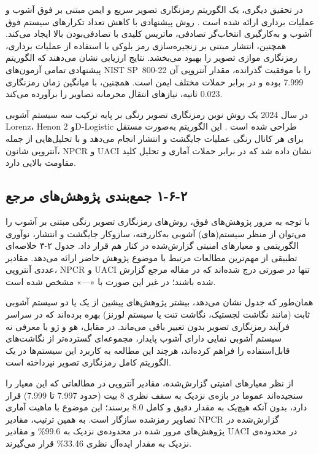 در تحقیق دیگری، یک الگوریتم رمزنگاری تصویر سریع و ایمن مبتنی بر فوق آشوب و عملیات برداری ارائه شده است \cite{ref12}. روش پیشنهادی با کاهش تعداد تکرارهای سیستم فوق آشوب و به‌کارگیری انتخاب‌گر تصادفی، ماتریس کلیدی با تصادفی‌بودن بالا ایجاد می‌کند. همچنین، انتشار مبتنی بر زنجیره‌سازی رمز بلوکی با استفاده از عملیات برداری، رمزنگاری موازی تصویر را بهبود می‌بخشد. نتایج ارزیابی نشان می‌دهند که الگوریتم پیشنهادی تمامی آزمون‌های NIST SP~800-22 را با موفقیت گذرانده، مقدار آنتروپی آن 7.999 بوده و در برابر حملات مختلف ایمن است. همچنین، با میانگین زمان رمزنگاری 0.023 ثانیه، نیازهای انتقال محرمانه تصاویر را برآورده می‌کند.

در سال 2024 یک روش نوین رمزنگاری تصویر رنگی بر پایه ترکیب سه سیستم آشوبی Lorenz، Henon و 2D-Logistic طراحی شده است \cite{ref13}. این الگوریتم به‌صورت مستقل برای هر کانال رنگی عملیات جایگشت و انتشار انجام می‌دهد و با تحلیل‌هایی از جمله آنتروپی شانون، NPCR و UACI نشان داده شد که در برابر حملات آماری و تحلیل کلید مقاومت بالایی دارد.

\subsection{‏۲‏-‏۶‏-‏۱‏ جمع‌بندی پژوهش‌های مرجع}

با توجه به مرور پژوهش‌های فوق، روش‌های رمزنگاری تصویر رنگی مبتنی بر آشوب را می‌توان از منظر سیستم(های) آشوبی به‌کاررفته، سازوکار جایگشت و انتشار، نوآوری الگوریتمی و معیارهای امنیتی گزارش‌شده در کنار هم قرار داد. جدول ۲-۳ خلاصه‌ای تطبیقی از مهم‌ترین مطالعات مرتبط با موضوع پژوهش حاضر ارائه می‌دهد. مقادیر عددی آنتروپی، NPCR و UACI تنها در صورتی درج شده‌اند که در مقاله مرجع گزارش شده باشند؛ در غیر این صورت با «---» مشخص شده است.

همان‌طور که جدول نشان می‌دهد، بیشتر پژوهش‌های پیشین از یک یا دو سیستم آشوبی ثابت (مانند نگاشت لجستیک، نگاشت تنت یا سیستم لورنز) بهره برده‌اند که در سراسر فرآیند رمزنگاری تصویر بدون تغییر باقی می‌ماند. در مقابل، هو و ژو \cite{ref4} با معرفی نه سیستم آشوبی نمایی دارای آشوب پایدار، مجموعه‌ای گسترده‌تر از نگاشت‌های قابل‌استفاده را فراهم کرده‌اند، هرچند این مطالعه به کاربرد این سیستم‌ها در یک الگوریتم کامل رمزنگاری تصویر نپرداخته است.

از نظر معیارهای امنیتی گزارش‌شده، مقادیر آنتروپی در مطالعاتی که این معیار را سنجیده‌اند عموما در بازه‌ی نزدیک به سقف نظری 8 بیت (حدود 7.997 تا 7.999) قرار دارد، بدون آنکه هیچ‌یک به مقدار دقیق و کامل 8.0 برسند؛ این موضوع با ماهیت آماری تصاویر رمزشده سازگار است. به همین ترتیب، مقادیر NPCR گزارش‌شده در پژوهش‌های مرور شده در محدوده‌ی نزدیک به 99.6\% و مقادیر UACI در محدوده‌ی نزدیک به مقدار ایده‌آل نظری 33.46\% قرار می‌گیرند.


